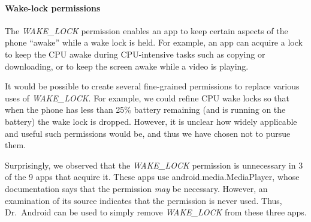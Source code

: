 \documentclass[preprint]{sig-alternate-10pt}
\newcommand{\code}[1]{\textsf{#1}}
\newcommand{\lib}{Mr.\ Hide\xspace}
\newcommand{\rewriter}{Dr.\ Android\xspace}
\newcommand{\perm}[1]{\textsf{\textit{#1}}}
\newcommand{\comment}[3][\color{red}]{}%
\newcommand{\tdm}[1]{\comment[\color{red}]{TDM}{#1}}
\newcommand{\jsjeon}[1]{\comment[\color{red}]{JJ}{#1}}
\begin{document}
\paragraph*{Wake-lock permissions}  
The \perm{WAKE\_LOCK} permission enables an app to keep certain
aspects of the phone ``awake'' while a wake lock is held.
For example,
an app can acquire a lock to keep the CPU awake during CPU-intensive
tasks such as copying or downloading, or to keep the screen awake while
a video is playing.

It would be possible to create several fine-grained permissions to
replace various uses of \perm{WAKE\_LOCK}.  For example, we could
refine CPU wake locks so that when the phone has less
than 25\% battery remaining (and is running on the battery) the wake
lock is dropped. However, it is unclear how widely applicable and
useful such permissions would be, and thus we have chosen not to
pursue them.


Surprisingly, we observed that the \perm{WAKE\_LOCK} permission is
unnecessary in 3 of the 9 apps that acquire it.  These apps use \code{android.media.MediaPlayer}, whose
documentation says that the permission \emph{may} be necessary.
However, an examination of its source indicates that the permission is
never used.  Thus, \rewriter can be used to 
simply remove \perm{WAKE\_LOCK} from these three apps.


\end{document}
